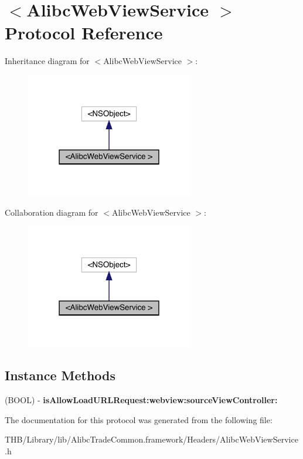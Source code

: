 \hypertarget{protocol_alibc_web_view_service_01-p}{}\section{$<$Alibc\+Web\+View\+Service $>$ Protocol Reference}
\label{protocol_alibc_web_view_service_01-p}


Inheritance diagram for $<$Alibc\+Web\+View\+Service $>$\+:\nopagebreak
\begin{figure}[H]
\begin{center}
\leavevmode
\includegraphics[width=207pt]{protocol_alibc_web_view_service_01-p__inherit__graph}
\end{center}
\end{figure}


Collaboration diagram for $<$Alibc\+Web\+View\+Service $>$\+:\nopagebreak
\begin{figure}[H]
\begin{center}
\leavevmode
\includegraphics[width=207pt]{protocol_alibc_web_view_service_01-p__coll__graph}
\end{center}
\end{figure}
\subsection*{Instance Methods}
\begin{DoxyCompactItemize}
\item 
\mbox{\label{protocol_alibc_web_view_service_01-p_ab42ba9377abd1273f9d5434508fa0637}} 
(B\+O\+OL) -\/ {\bfseries is\+Allow\+Load\+U\+R\+L\+Request\+:webview\+:source\+View\+Controller\+:}
\end{DoxyCompactItemize}


The documentation for this protocol was generated from the following file\+:\begin{DoxyCompactItemize}
\item 
T\+H\+B/\+Library/lib/\+Alibc\+Trade\+Common.\+framework/\+Headers/Alibc\+Web\+View\+Service.\+h\end{DoxyCompactItemize}
